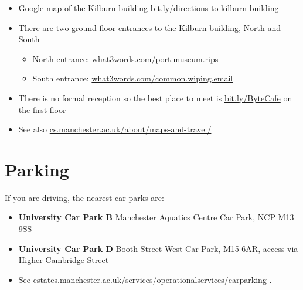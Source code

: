 \documentclass[12pt,]{book}
\providecommand{\tightlist}{%
  \setlength{\itemsep}{0pt}\setlength{\parskip}{0pt}}
\begin{document}
\begin{itemize}
\tightlist
\item
  Google map of the Kilburn building \href{http://bit.ly/directions-to-kilburn-building}{bit.ly/directions-to-kilburn-building}
\item
  There are two ground floor entrances to the Kilburn building, North and South

  \begin{itemize}
  \tightlist
  \item
    North entrance: \href{https://what3words.com/port.museum.rips}{what3words.com/port.museum.rips}
  \item
    South entrance: \href{https://what3words.com/common.wiping.email}{what3words.com/common.wiping.email}
  \end{itemize}
\item
  There is no formal reception so the best place to meet is \href{http://bit.ly/ByteCafe}{bit.ly/ByteCafe} on the first floor
\item
  See also \href{https://www.cs.manchester.ac.uk/about/maps-and-travel/}{cs.manchester.ac.uk/about/maps-and-travel/}
\end{itemize}

\hypertarget{parking}{%
\section{Parking}\label{parking}}

If you are driving, the nearest car parks are:

\begin{itemize}
\tightlist
\item
  \textbf{University Car Park B} \href{https://www.ncp.co.uk/find-a-car-park/car-parks/manchester-aquatic-centre-jv/}{Manchester Aquatics Centre Car Park}, NCP \href{http://maps.google.co.uk/maps?q=M13+9SS}{M13 9SS}
\item
  \textbf{University Car Park D} Booth Street West Car Park, \href{http://maps.google.co.uk/maps?q=M15+6AR}{M15 6AR}, access via Higher Cambridge Street
\item
  See \href{https://www.estates.manchester.ac.uk/services/operationalservices/carparking/}{estates.manchester.ac.uk/services/operationalservices/carparking}
  .
\end{itemize}


\end{document}
